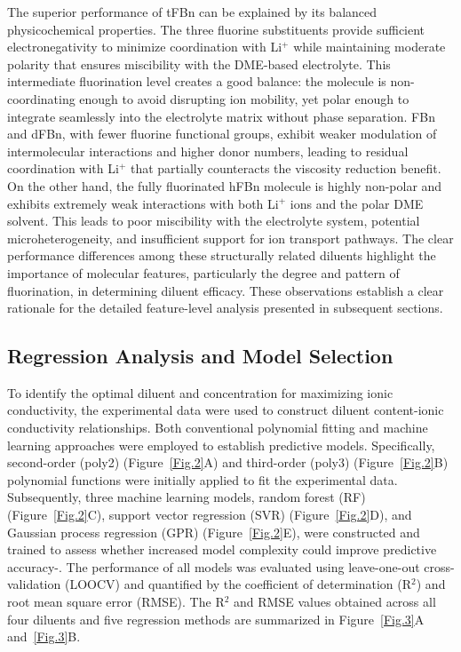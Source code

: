 \documentclass[11pt, a4paper]{article}
\begin{document}
The superior performance of tFBn can be explained by its balanced physicochemical properties. The three fluorine substituents provide sufficient electronegativity to minimize coordination with Li$^+$ while maintaining moderate polarity that ensures miscibility with the DME-based electrolyte. This intermediate fluorination level creates a good balance: the molecule is non-coordinating enough to avoid disrupting ion mobility, yet polar enough to integrate seamlessly into the electrolyte matrix without phase separation. FBn and dFBn, with fewer fluorine functional groups, exhibit weaker modulation of intermolecular interactions and higher donor numbers, leading to residual coordination with Li$^+$ that partially counteracts the viscosity reduction benefit. On the other hand, the fully fluorinated hFBn molecule is highly non-polar and exhibits extremely weak interactions with both Li$^+$ ions and the polar DME solvent. This leads to poor miscibility with the electrolyte system, potential microheterogeneity, and insufficient support for ion transport pathways. The clear performance differences among these structurally related diluents highlight the importance of molecular features, particularly the degree and pattern of fluorination, in determining diluent efficacy. These observations establish a clear rationale for the detailed feature-level analysis presented in subsequent sections.

\subsection{Regression Analysis and Model Selection}

To identify the optimal diluent and concentration for maximizing ionic conductivity, the experimental data were used to construct diluent content-ionic conductivity relationships. Both conventional polynomial fitting and machine learning approaches were employed to establish predictive models. Specifically, second-order (poly2) (Figure~\ref{Fig.2}A) and third-order (poly3) (Figure~\ref{Fig.2}B) polynomial functions were initially applied to fit the experimental data. Subsequently, three machine learning models, random forest (RF) (Figure~\ref{Fig.2}C), support vector regression (SVR) (Figure~\ref{Fig.2}D), and Gaussian process regression (GPR) (Figure~\ref{Fig.2}E), were constructed and trained to assess whether increased model complexity could improve predictive accuracy\cite{ref.12}-\cite{ref.14}. The performance of all models was evaluated using leave-one-out cross-validation (LOOCV) and quantified by the coefficient of determination (R$^2$) and root mean square error (RMSE). The R$^2$ and RMSE values obtained across all four diluents and five regression methods are summarized in Figure~\ref{Fig.3}A and~\ref{Fig.3}B.\\
\end{document}
